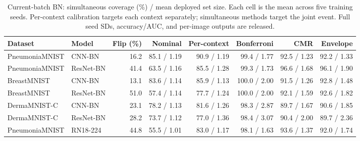 \begin{table}[t]
\centering
\caption{Current-batch BN: simultaneous coverage (\%) / mean deployed set size. Each cell is the mean across five training seeds. Per-context calibration targets each context separately; simultaneous methods target the joint event. Full seed SDs, accuracy/AUC, and per-image outputs are released.}
\label{tab:main}
\begin{tabular}{llrrrrrr}\toprule
Dataset & Model & Flip (\%) & Nominal & Per-context & Bonferroni & CMR & Envelope\\\midrule
PneumoniaMNIST & CNN-BN & 16.2 & 85.1 / 1.19 & 90.9 / 1.19 & 99.4 / 1.77 & 92.5 / 1.23 & 92.2 / 1.33\\
PneumoniaMNIST & ResNet-BN & 41.4 & 63.5 / 1.16 & 85.5 / 1.28 & 99.3 / 1.73 & 96.6 / 1.68 & 96.1 / 1.90\\
BreastMNIST & CNN-BN & 13.1 & 83.6 / 1.14 & 85.9 / 1.13 & 100.0 / 2.00 & 91.5 / 1.26 & 92.8 / 1.48\\
BreastMNIST & ResNet-BN & 51.0 & 57.4 / 1.14 & 77.7 / 1.24 & 100.0 / 2.00 & 92.1 / 1.59 & 92.6 / 1.82\\
DermaMNIST-C & CNN-BN & 23.1 & 78.2 / 1.13 & 81.6 / 1.26 & 98.3 / 2.87 & 89.7 / 1.67 & 90.6 / 1.85\\
DermaMNIST-C & ResNet-BN & 28.2 & 73.7 / 1.12 & 77.0 / 1.36 & 98.4 / 3.07 & 90.4 / 2.00 & 89.7 / 2.36\\
PneumoniaMNIST & RN18-224 & 44.8 & 55.5 / 1.01 & 83.0 / 1.17 & 98.1 / 1.63 & 93.6 / 1.37 & 92.0 / 1.74\\
\bottomrule\end{tabular}
\end{table}
